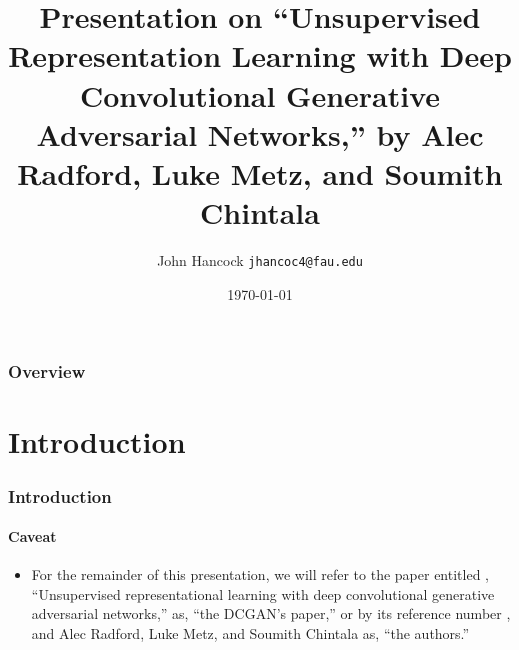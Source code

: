 \documentclass{beamer}
\title[Unsupervised Representation Learning with Deep Convolutional
Generative Adversarial Networks]{Presentation on ``Unsupervised Representation 
Learning with Deep Convolutional Generative Adversarial Networks,'' by Alec Radford, Luke Metz, and Soumith Chintala} %
\author[Joh Hancock]{John Hancock \texttt{jhancoc4@fau.edu}}
\date{\today} %
\begin{document}
\begin{frame}
\titlepage %
\end{frame}

\begin{frame}
\frametitle{Overview} %
\tableofcontents %
\end{frame}

\section{Introduction}

\begin{frame}
\frametitle{Introduction}
\framesubtitle{Caveat}
\begin{itemize}
    \item For the remainder of this presentation, we will refer to the paper
entitled , ``Unsupervised representational learning with deep convolutional
generative adversarial networks,'' as,  ``the DCGAN's paper,'' or by its
reference number \cite{repLearnDcgan}, and Alec Radford,  Luke Metz, and Soumith 
Chintala as, ``the authors.''
\end{itemize}
\end{frame}


\end{document}
